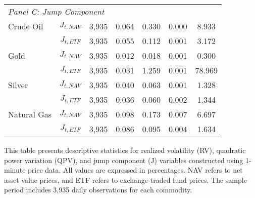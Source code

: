 \begin{table}[htbp]
\begin{threeparttable}
\begin{tabular}{@{}lcccccc@{}}
\multicolumn{7}{l}{\textit{Panel C: Jump Component}} \\
\addlinespace[0.1cm]
Crude Oil & $J_{t,NAV}$ & 3,935 & 0.064 & 0.330 & 0.000 & 8.933 \\
          & $J_{t,ETF}$ & 3,935 & 0.055 & 0.112 & 0.001 & 3.172 \\
\addlinespace[0.05cm]
Gold      & $J_{t,NAV}$ & 3,935 & 0.012 & 0.018 & 0.001 & 0.300 \\
          & $J_{t,ETF}$ & 3,935 & 0.031 & 1.259 & 0.001 & 78.969 \\
\addlinespace[0.05cm]
Silver    & $J_{t,NAV}$ & 3,935 & 0.040 & 0.063 & 0.001 & 1.328 \\
          & $J_{t,ETF}$ & 3,935 & 0.036 & 0.060 & 0.002 & 1.344 \\
\addlinespace[0.05cm]
Natural Gas & $J_{t,NAV}$ & 3,935 & 0.098 & 0.173 & 0.007 & 6.697 \\
            & $J_{t,ETF}$ & 3,935 & 0.086 & 0.095 & 0.004 & 1.634 \\
\bottomrule
\end{tabular}
\begin{tablenotes}
\small
\item This table presents descriptive statistics for realized volatility (RV), quadratic power variation (QPV), and jump component (J) variables constructed using 1-minute price data. All values are expressed in percentages. NAV refers to net asset value prices, and ETF refers to exchange-traded fund prices. The sample period includes 3,935 daily observations for each commodity.
\end{tablenotes}
\end{threeparttable}
\end{table}

